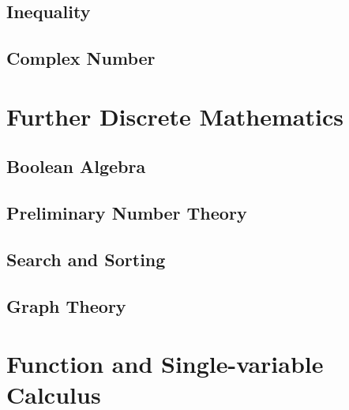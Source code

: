 \documentclass[
	12pt, %
	fleqn, %
	a4paper, %
]{LegrandOrangeBook}
\begin{document}

\chapterspaceabove{6.75cm} 
\chapterspacebelow{7.25cm} 
\chapter{Inequality}


\chapterspaceabove{6.75cm} 
\chapterspacebelow{7.25cm} 
\chapter{Complex Number}

\part{Further Discrete Mathematics}


\chapterspaceabove{6.75cm} 
\chapterspacebelow{7.25cm} 
\chapter{Boolean Algebra}

\chapterspaceabove{6.75cm} 
\chapterspacebelow{7.25cm} 
\chapter{Preliminary Number Theory}
\chapterspaceabove{6.75cm} 
\chapterspacebelow{7.25cm} 
\chapter{Search and Sorting}
\chapterspaceabove{6.75cm} 
\chapterspacebelow{7.25cm} 
\chapter{Graph Theory}

\part{Function and Single-variable Calculus}
\end{document}

